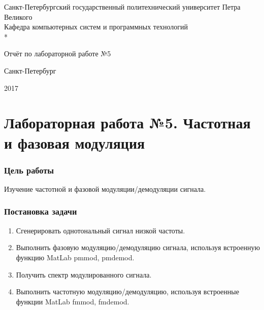 \documentclass[a4paper,14pt]{article}
\begin{document}

\begin{titlepage}
	\newpage
	
	\begin{center}
		Санкт-Петербургский государственный политехнический 
		университет Петра Великого \\
		\vspace{1cm}
		Кафедра компьютерных систем и программных технологий\\*
	\end{center}
	
	\vspace{8em}
	
	\begin{center}
		 Отчёт по лабораторной работе №5
	\end{center}
	
	\vspace{2.5em}

	\vspace{6em}

	\vspace{\fill}
	
	\begin{center}
		Санкт-Петербург
		
		 2017
	\end{center}
	
\end{titlepage}

\tableofcontents

\newpage

\part*{Лабораторная работа №5. Частотная и фазовая модуляция}
\setcounter {section}{0}
\setcounter {equation}{0}
\setcounter {figure}{0}
\section{Цель работы}
\hspace{0,5cm}   Изучение частотной и фазовой модуляции/демодуляции сигнала.
\section{Постановка задачи}
\begin{enumerate}
\item Сгенерировать однотональный сигнал низкой частоты.
\item  Выполнить фазовую модуляцию/демодуляцию сигнала, используя встроенную функцию MatLab pmmod, pmdemod.
\item Получить спектр модулированного сигнала.
\item Выполнить частотную модуляцию/демодуляцию, используя встроенные функции MatLab fmmod, fmdemod.
\end{enumerate}
\end{document}
